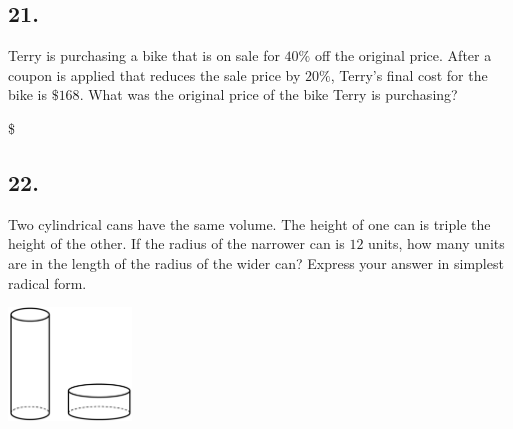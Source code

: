 \documentclass[12pt]{article}
\newenvironment{answer}{\vspace{1em}}{}
\newenvironment{answer}{\vspace{0em}\expandafter\comment}{\expandafter\endcomment}
\newlength{\currentparskip}
\newlength{\currentparindent}
\newenvironment{minipagex}[2][]
  {\setlength{\currentparskip}{\parskip}%
    \setlength{\currentparindent}{\parindent}%
   \begin{minipage}[#1]{#2}%
   \setlength{\parskip}{\currentparskip}%
   \setlength{\parindent}{\currentparindent}%
  }
  {\end{minipage}}
\begin{document}
\subsection*{21.}
Terry is purchasing a bike that is on sale for $40\%$ off the original price. After a coupon is applied that reduces the sale price by $20\%$, Terry's final  cost for the bike is $\$168$. What was the original price of the bike Terry is purchasing?

\$~\fbox{\phantom{ANSWER}}

\begin{answer}
%
\end{answer}




\subsection*{22.}
Two cylindrical cans have the same volume. The height of one can is triple the height of the other. If the radius of the narrower can is $12$ units, how many units are in the length of the radius of the wider can? Express your answer in simplest radical form. 

\begin{minipagex}[b]{\linewidth}
\centering
\includegraphics[height=3cm]{sprint-22-figure}
\end{minipagex}
\end{document}
